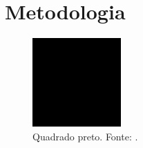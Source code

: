 \section{Metodologia}%
\label{sec:metodologia}

\begin{figure}[!ht]%
    \centering
    \includegraphics[scale=0.5]{img/black-square.png}
    \caption{Quadrado preto. Fonte: .}%
    \label{fig:f1}
\end{figure}

